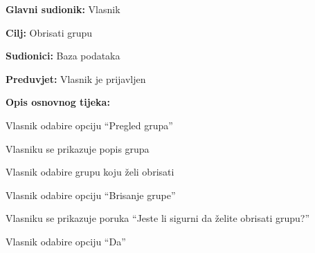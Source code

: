 			\noindent {}
			\begin{packed_item}
				\item \textbf{Glavni sudionik: } Vlasnik
				\item  \textbf{Cilj:} Obrisati grupu
				\item  \textbf{Sudionici:} Baza podataka
				\item  \textbf{Preduvjet:} Vlasnik je prijavljen
				\item  \textbf{Opis osnovnog tijeka:}
				\item[] \begin{packed_enum}
					\item Vlasnik odabire opciju “Pregled grupa”
					\item Vlasniku se prikazuje popis grupa
					\item Vlasnik odabire grupu koju želi obrisati
					\item Vlasnik odabire opciju “Brisanje grupe”
					\item Vlasniku se prikazuje poruka “Jeste li sigurni da želite obrisati grupu?”
					\item Vlasnik odabire opciju “Da”
				\end{packed_enum}
			\end{packed_item}
			\eject
			
